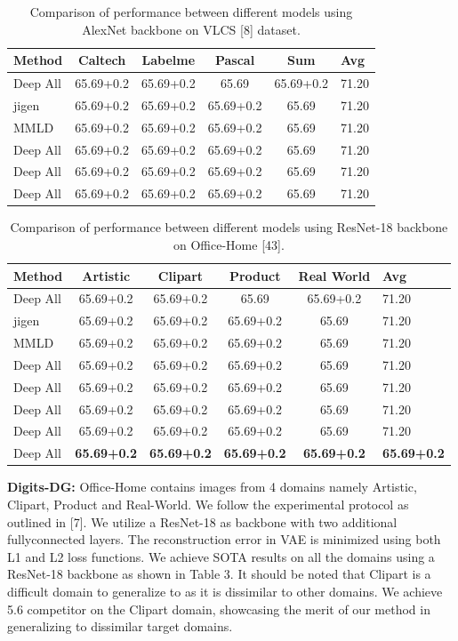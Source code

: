 \documentclass[review]{cvpr}
\begin{document}
\begin{table}[t]
\small
  \label{tab:tab2}
  \begin{tabular}{lccccl}
   \hline
    Method & Caltech &Labelme & Pascal & Sum &Avg\\
    \hline
   Deep All & \small{65.69+0.2} &65.69+0.2 &65.69&65.69+0.2 & 71.20 \\ \hline
   jigen & 65.69+0.2 &65.69+0.2 &65.69+0.2&65.69 & 71.20 \\ \hline
   MMLD & 65.69+0.2 &65.69+0.2 &65.69+0.2&65.69 & 71.20 \\ \hline
   Deep All & 65.69+0.2 &65.69+0.2 &65.69+0.2&65.69 & 71.20 \\ \hline
   Deep All & 65.69+0.2 &65.69+0.2 &65.69+0.2&65.69 & 71.20 \\ \hline
   Deep All & 65.69+0.2 &65.69+0.2 &65.69+0.2&65.69 & 71.20 \\ \hline
\end{tabular}
\caption{Comparison of performance between different
models using AlexNet backbone on VLCS [8] dataset.}
\end{table}
\begin{table}
\small
  \label{tab:tab3}
  \begin{tabular}{lccccl}
   \hline
    Method & Artistic & Clipart & Product & Real World &Avg\\
    \hline
   Deep All & \small{65.69+0.2} &65.69+0.2 &65.69&65.69+0.2 & 71.20 \\ \hline
   jigen & 65.69+0.2 &65.69+0.2 &65.69+0.2&65.69 & 71.20 \\ \hline
   MMLD & 65.69+0.2 &65.69+0.2 &65.69+0.2&65.69 & 71.20 \\ \hline
   Deep All & 65.69+0.2 &65.69+0.2 &65.69+0.2&65.69 & 71.20 \\ \hline
   Deep All & 65.69+0.2 &65.69+0.2 &65.69+0.2&65.69 & 71.20 \\ \hline
   Deep All & 65.69+0.2 &65.69+0.2 &65.69+0.2&65.69 & 71.20 \\ \hline
    Deep All & 65.69+0.2 &65.69+0.2 &65.69+0.2&65.69 & 71.20 \\ \hline
     Deep All & \textbf{65.69+0.2} &\textbf{65.69+0.2} &\textbf{65.69+0.2}&\textbf{65.69+0.2} & \textbf{65.69+0.2} \\ \hline
\end{tabular}
\caption{Comparison of performance between different
models using ResNet-18 backbone on Office-Home [43].}
\end{table}


\textbf{Digits-DG:} Office-Home contains images from 4 domains namely Artistic, Clipart, Product and Real-World.
We follow the experimental protocol as outlined in [7]. We
utilize a ResNet-18 as backbone with two additional fullyconnected layers. The reconstruction error in VAE is minimized using both L1 and L2 loss functions. We achieve
SOTA results on all the domains using a ResNet-18 backbone as shown in Table 3. It should be noted that Clipart is
a difficult domain to generalize to as it is dissimilar to other
domains. We achieve 5.6%
competitor on the Clipart domain, showcasing the merit of
our method in generalizing to dissimilar target domains.
\end{document}
